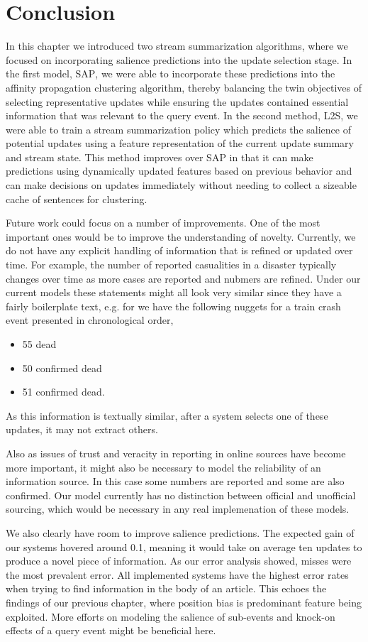 \section{Conclusion}

In this chapter we introduced two stream summarization algorithms, where we
focused on incorporating salience predictions into the update selection stage.
In the first model, \textsc{SAP}, we were able to incorporate these
predictions into the affinity propagation clustering algorithm, thereby
balancing the twin objectives of selecting representative updates while
ensuring the updates contained essential information that was relevant to the
query event. In the second method,  \textsc{L2S}, we were able to train a
stream summarization policy which predicts the salience of potential updates
using a feature representation of the current update summary and stream state.
This method improves over \textsc{SAP} in that it can make predictions using
dynamically updated features based on previous behavior and can make decisions
on updates immediately without needing to collect a sizeable cache of
sentences for clustering.

Future work could focus on a number of improvements. One of the most important
ones would be to improve the understanding of novelty. Currently, we do not
have any explicit handling of information that is refined or updated over
time.  For example, the number of reported casualities in a disaster typically
changes over time as more cases are reported and nubmers are refined.  Under
our current models these statements might all look very similar since they
have a fairly boilerplate text, e.g. for we have the following nuggets for a
train crash event presented in chronological order,
\begin{itemize}
\item 55 dead
\item 50 confirmed dead
\item 51 confirmed dead.
\end{itemize}
As this information is textually similar, after a system selects one of these
updates, it may not extract others.

Also as issues of trust and veracity in reporting in online sources have
become more important, it might also be necessary to model the reliability of
an information source. In this case some numbers are reported and some are
also confirmed. Our model currently has no distinction between official and
unofficial sourcing, which would be necessary in any real implemenation of
these models.

We also clearly have room to improve salience predictions. The expected gain
of our systems hovered around 0.1, meaning it would take on average ten
updates to produce a novel piece of information. As our error analysis showed,
misses were the most prevalent error. All implemented systems have the highest
error rates when trying to find information in the body of an article. This
echoes the findings of our previous chapter, where position bias is
predominant feature being exploited. More efforts on modeling the salience of
sub-events and knock-on effects of a query event might be beneficial here. 
